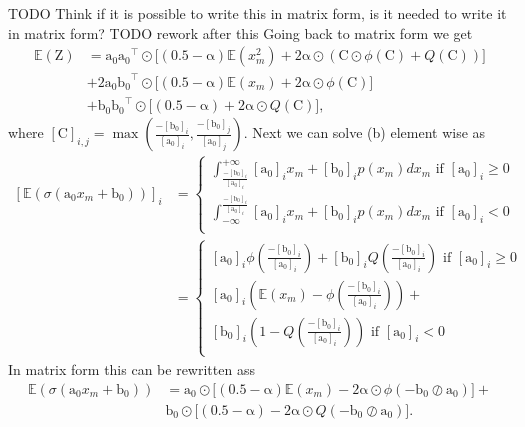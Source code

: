 \documentclass[12pt]{article}
\newcommand{\vect}[1]{\boldsymbol{\mathrm{#1}}}
\newcommand{\mat}[1]{\boldsymbol{\mathrm{#1}}}
\newcommand{\TODO}[1]{{\color{red} TODO {#1}}}
\newcommand{\expt}[1]{\mathbb{E}\left(#1\right)}
\theoremstyle{remark}
\begin{document}
\TODO{Think if it is possible to write this in matrix form, is it needed to write it in matrix form?}
\TODO{rework after this}
Going back to matrix form we get 
\begin{align}
	\expt{\mat{Z}} &= \vect{a_0} \vect{a_0}^{\intercal} \odot \big[(0.5-\vect{\alpha})\expt{x_m^2} + 2\vect{\alpha} \odot \left(\mat{C} \odot \phi(\mat{C}) + Q(\mat{C})\right) \big] \\
	&+2 \vect{a_0}\vect{b_0}^{\intercal} \odot \big[(0.5-\vect{\alpha})\expt{x_m} + 2\vect{\alpha} \odot \phi(\mat{C})\big] \\
	&+\vect{b_0}\vect{b_0}^{\intercal} \odot \big[(0.5-\vect{\alpha}) + 2\vect{\alpha} \odot Q(\mat{C})\big],
\end{align}
where $[\mat{C}]_{i,j} = \max\left(\frac{-[\vect{b_0}]_i}{[\vect{a_0}]_i}, \frac{-[\vect{b_0}]_j}{[\vect{a_0}]_j}\right)$.
Next we can solve (b) element wise as
\begin{align}
	\left[\expt{\sigma(\vect{a_0}x_m + \vect{b_0})}\right]_i &= \begin{cases}
		\int_{\frac{-[\vect{b_0}]_i}{[\vect{a_0}]_i}}^{+\infty} [\vect{a_0}]_i x_m + [\vect{b_0}]_i p(x_m)dx_m \text{ if } [\vect{a_0}]_i \geq 0 \\
		\int_{-\infty}^{\frac{-[\vect{b_0}]_i}{[\vect{a_0}]_i}} [\vect{a_0}]_i x_m + [\vect{b_0}]_i p(x_m)dx_m \text{ if } [\vect{a_0}]_i < 0 \\
	\end{cases}\\
	&= \begin{cases}
		[\vect{a_0}]_i \phi\left(\frac{-[\vect{b_0}]_i}{[\vect{a_0}]_i}\right) + [\vect{b_0}]_i Q\left(\frac{-[\vect{b_0}]_i}{[\vect{a_0}]_i}\right)\text{ if } [\vect{a_0}]_i \geq 0 \\
		[\vect{a_0}]_i \left(\expt{x_m} - \phi\left(\frac{-[\vect{b_0}]_i}{[\vect{a_0}]_i}\right) \right)+\\
		 [\vect{b_0}]_i \left(1 - Q\left(\frac{-[\vect{b_0}]_i}{[\vect{a_0}]_i}\right) \right)\text{ if } [\vect{a_0}]_i < 0 \\
	\end{cases}
\end{align}
In matrix form this can be rewritten ass
\begin{align}
	\expt{\sigma(\vect{a_0}x_m + \vect{b_0})} &= \vect{a_0} \odot \big[(0.5-\vect{\alpha}) \expt{x_m} - 2\vect{\alpha} \odot \phi(-\vect{b_0} \oslash \vect{a_0}) \big]+\\
	& \vect{b_0} \odot \big[(0.5 - \vect{\alpha}) - 2 \vect{\alpha} \odot Q(-\vect{b_0} \oslash \vect{a_0})\big].
\end{align}
\end{document}
